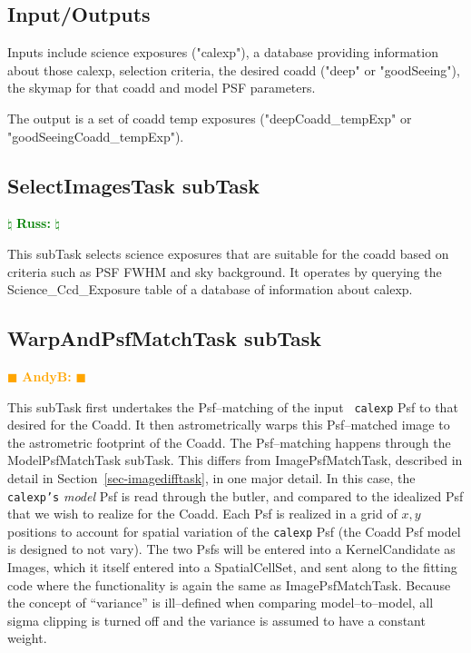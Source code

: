 \documentclass[12pt]{article}
\newcommand{\becker} { \textcolor{orange} {
\ensuremath{\blacksquare} {\bf AndyB:}  
\ensuremath{\blacksquare} } }
\newcommand{\russ} { \textcolor{green} {
\ensuremath{\natural} {\bf Russ:}  
\ensuremath{\natural} } }
\begin{document}
\subsection{Input/Outputs}

Inputs include science exposures ("calexp"), a database providing information about
those calexp, selection criteria, the desired coadd ("deep" or "goodSeeing"),
the skymap for that coadd and model PSF parameters.

The output is a set of coadd temp exposures ("deepCoadd\_tempExp" or "goodSeeingCoadd\_tempExp").

\subsection{SelectImagesTask subTask} \russ

This subTask selects science exposures that are suitable for the coadd
based on criteria such as PSF FWHM and sky background. It operates by
querying the Science\_Ccd\_Exposure table of a database of information about calexp.

\subsection{WarpAndPsfMatchTask subTask} \becker

This subTask first undertakes the Psf--matching of the input {\tt
  calexp} Psf to that desired for the Coadd.  It then astrometrically
warps this Psf--matched image to the astrometric footprint of the
Coadd.  The Psf--matching happens through the ModelPsfMatchTask
subTask.  This differs from ImagePsfMatchTask, described in detail in
Section~\ref{sec-imagedifftask}, in one major detail.  In this case,
the {\tt calexp's} {\it model} Psf is read through the butler, and
compared to the idealized Psf that we wish to realize for the Coadd.
Each Psf is realized in a grid of $x,y$ positions to account for
spatial variation of the {\tt calexp} Psf (the Coadd Psf model is
designed to not vary).  The two Psfs will be entered into a
KernelCandidate as Images, which it itself entered into a
SpatialCellSet, and sent along to the fitting code where the
functionality is again the same as ImagePsfMatchTask.  Because the
concept of ``variance'' is ill--defined when comparing
model--to--model, all sigma clipping is turned off and the variance is
assumed to have a constant weight.
\end{document}
